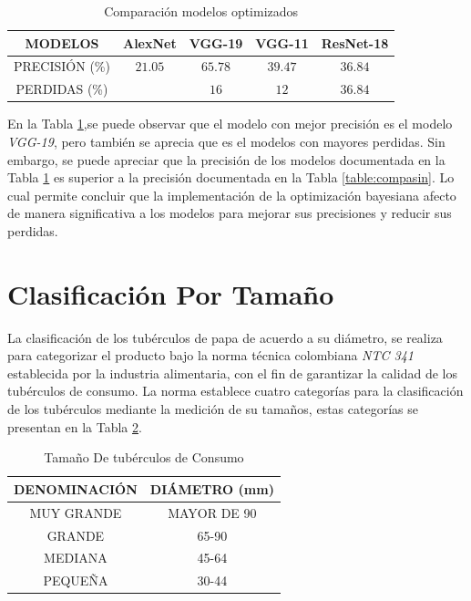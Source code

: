 		\begin{table}[ht]
			\centering
			\begin{tabular}{|c|c|c|c|c|}
				\hline
				MODELOS & AlexNet & VGG-19 & VGG-11 & ResNet-18 \\
				\hline
				PRECISIÓN (\%) & $$21.05$$ & $$65.78$$ & $$39.47$$ & $$36.84$$ \\
				\hline
				PERDIDAS (\%) &  & $$16$$ & $$12$$ & $$36.84$$ \\
				\hline
			\end{tabular}	
			\caption{Comparación modelos optimizados}
			\label{table:compacon}
		\end{table}	
		
		En la Tabla \ref{table:compacon},se puede observar que el modelo con mejor precisión es el modelo \textit{VGG-19}, pero también se aprecia que es el modelos con mayores perdidas. Sin embargo, se puede apreciar que la precisión de los modelos documentada en la Tabla \ref{table:compacon} es superior a la precisión documentada en la Tabla \ref{table:compasin}. Lo cual permite concluir que la implementación de la optimización bayesiana afecto de manera significativa a los modelos para mejorar sus precisiones y reducir sus perdidas.
	
	
	\newpage		
	\section{Clasificación Por Tamaño}
	
	La clasificación de los tubérculos de papa de acuerdo a su diámetro, se realiza para categorizar el producto bajo la norma técnica colombiana \textit{NTC 341} establecida por la industria alimentaria, con el fin de garantizar la calidad de los tubérculos de consumo. 	La norma establece cuatro categorías para la clasificación de los tubérculos mediante la medición de su tamaños, estas categorías se presentan en la Tabla \ref{table:limites}.
		
	\begin{table}[ht]
		\centering
		\begin{tabular}{|c|c|}
			\hline
			DENOMINACIÓN & DIÁMETRO (mm) \\
			\hline
			MUY GRANDE & MAYOR DE 90 \\
			\hline
			GRANDE & 65-90 \\
			\hline
			MEDIANA	& 45-64 \\
			\hline
			PEQUEÑA & 30-44 \\
			\hline
		\end{tabular}	
		\caption{Tamaño De tubérculos de Consumo}
		\label{table:limites}
	\end{table}	
	
